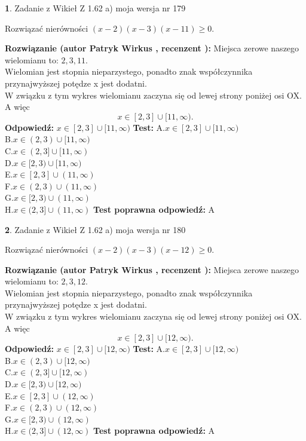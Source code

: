 \documentclass[12pt, a4paper]{article}
\theoremstyle{definition} %
\newtheorem{zad}{}
\newcommand{\zadStart}[1]{\begin{zad}#1\newline}
\newcommand{\zadStop}{\end{zad}}
\newcommand{\rozwStart}[2]{\noindent \textbf{Rozwiązanie (autor #1 , recenzent #2): }\newline}
\newcommand{\rozwStop}{\newline}
\newcommand{\odpStart}{\noindent \textbf{Odpowiedź:}\newline}
\newcommand{\odpStop}{\newline}
\newcommand{\testStart}{\noindent \textbf{Test:}\newline}
\newcommand{\testStop}{\newline}
\newcommand{\kluczStart}{\noindent \textbf{Test poprawna odpowiedź:}\newline}
\newcommand{\kluczStop}{\newline}
\begin{document}
\zadStart{Zadanie z Wikieł Z 1.62 a) moja wersja nr 179}

Rozwiązać nierówności $(x-2)(x-3)(x-11)\ge0$.
\zadStop
\rozwStart{Patryk Wirkus}{}
Miejsca zerowe naszego wielomianu to: $2, 3, 11$.\\
Wielomian jest stopnia nieparzystego, ponadto znak współczynnika przy\linebreak najwyższej potędze x jest dodatni.\\ W związku z tym wykres wielomianu zaczyna się od lewej strony poniżej osi OX. A więc $$x \in [2,3] \cup [11,\infty).$$
\rozwStop
\odpStart
$x \in [2,3] \cup [11,\infty)$
\odpStop
\testStart
A.$x \in [2,3] \cup [11,\infty)$\\
B.$x \in (2,3) \cup [11,\infty)$\\
C.$x \in (2,3] \cup [11,\infty)$\\
D.$x \in [2,3) \cup [11,\infty)$\\
E.$x \in [2,3] \cup (11,\infty)$\\
F.$x \in (2,3) \cup (11,\infty)$\\
G.$x \in [2,3) \cup (11,\infty)$\\
H.$x \in (2,3] \cup (11,\infty)$
\testStop
\kluczStart
A
\kluczStop



\zadStart{Zadanie z Wikieł Z 1.62 a) moja wersja nr 180}

Rozwiązać nierówności $(x-2)(x-3)(x-12)\ge0$.
\zadStop
\rozwStart{Patryk Wirkus}{}
Miejsca zerowe naszego wielomianu to: $2, 3, 12$.\\
Wielomian jest stopnia nieparzystego, ponadto znak współczynnika przy\linebreak najwyższej potędze x jest dodatni.\\ W związku z tym wykres wielomianu zaczyna się od lewej strony poniżej osi OX. A więc $$x \in [2,3] \cup [12,\infty).$$
\rozwStop
\odpStart
$x \in [2,3] \cup [12,\infty)$
\odpStop
\testStart
A.$x \in [2,3] \cup [12,\infty)$\\
B.$x \in (2,3) \cup [12,\infty)$\\
C.$x \in (2,3] \cup [12,\infty)$\\
D.$x \in [2,3) \cup [12,\infty)$\\
E.$x \in [2,3] \cup (12,\infty)$\\
F.$x \in (2,3) \cup (12,\infty)$\\
G.$x \in [2,3) \cup (12,\infty)$\\
H.$x \in (2,3] \cup (12,\infty)$
\testStop
\kluczStart
A
\kluczStop
\end{document}

